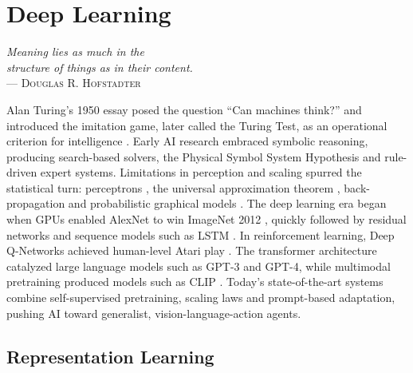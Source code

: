 
\section{Deep Learning}

\begin{flushright}{\slshape    
    \textit{Meaning lies as much in the \\
    structure of things as in their content.}} \\ \medskip
    --- \textsc{Douglas R. Hofstadter} \cite{GEB1999}
\end{flushright}

\bigskip

Alan Turing's 1950 essay posed the question ``Can machines think?'' and introduced the imitation game, later called the Turing Test, as an operational criterion for intelligence \cite{TURING1950}. Early AI research embraced symbolic reasoning, producing search-based solvers, the Physical Symbol System Hypothesis \cite{NEWELL1976} and rule-driven expert systems. Limitations in perception and scaling spurred the statistical turn: perceptrons \cite{PERCEPTRON1958}, the universal approximation theorem \cite{SIGMOID1989}, back-propagation \cite{BACKPROP1986} and probabilistic graphical models \cite{PEARLPROB1988}. The deep learning era began when GPUs enabled AlexNet to win ImageNet 2012 \cite{IMAGENET2012}, quickly followed by residual networks \cite{RESNET2016} and sequence models such as LSTM \cite{LSTM1997}. In reinforcement learning, Deep Q-Networks achieved human-level Atari play \cite{MNIH2015}. The transformer architecture \cite{ATTENTION2023} catalyzed large language models such as GPT-3 \cite{GPT32020} and GPT-4, while multimodal pretraining produced models such as CLIP \cite{CLIP2021}. Today’s state-of-the-art systems combine self-supervised pretraining, scaling laws and prompt-based adaptation, pushing AI toward generalist, vision-language-action agents.

\subsection{Representation Learning}

